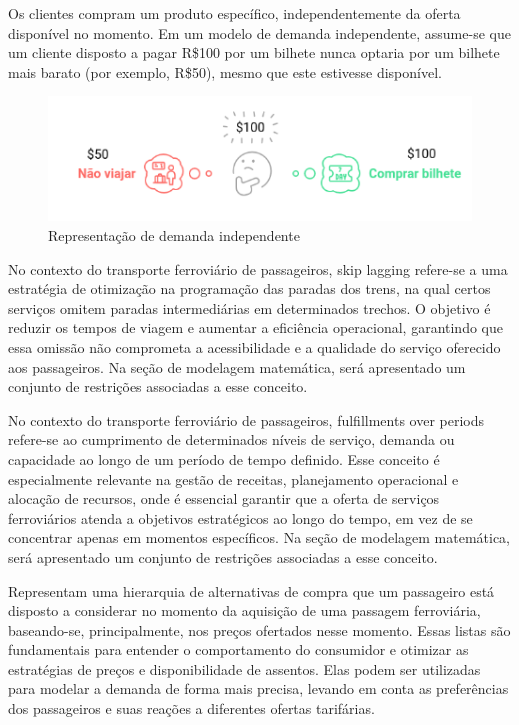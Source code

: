 \begin{description}[style=unboxed, leftmargin=0cm]
	\item[Demanda independente:] Os clientes compram um produto específico, independentemente da oferta disponível no momento. Em um modelo de demanda independente, assume-se que um cliente disposto a pagar R\$100 por um bilhete nunca optaria por um bilhete mais barato (por exemplo, R\$50), mesmo que este estivesse disponível.

	      \begin{figure}[H]
		      \begin{center}
			      \includegraphics[scale=0.7]{img/di1.png}
			      \caption{Representação de demanda independente}
			      \label{fig: di1}
		      \end{center}
	      \end{figure}
	      \vspace{-1cm}

	\item[Skip lagging:] No contexto do transporte ferroviário de passageiros, skip lagging refere-se a uma estratégia de otimização na programação das paradas dos trens, na qual certos serviços omitem paradas intermediárias em determinados trechos. O objetivo é reduzir os tempos de viagem e aumentar a eficiência operacional, garantindo que essa omissão não comprometa a acessibilidade e a qualidade do serviço oferecido aos passageiros. Na seção de modelagem matemática, será apresentado um conjunto de restrições associadas a esse conceito.

	\item[Fulfillments over periods:] No contexto do transporte ferroviário de passageiros, fulfillments over periods refere-se ao cumprimento de determinados níveis de serviço, demanda ou capacidade ao longo de um período de tempo definido. Esse conceito é especialmente relevante na gestão de receitas, planejamento operacional e alocação de recursos, onde é essencial garantir que a oferta de serviços ferroviários atenda a objetivos estratégicos ao longo do tempo, em vez de se concentrar apenas em momentos específicos. Na seção de modelagem matemática, será apresentado um conjunto de restrições associadas a esse conceito.

	\item[Listas de preferência:] Representam uma hierarquia de alternativas de compra que um passageiro está disposto a considerar no momento da aquisição de uma passagem ferroviária, baseando-se, principalmente, nos preços ofertados nesse momento. Essas listas são fundamentais para entender o comportamento do consumidor e otimizar as estratégias de preços e disponibilidade de assentos. Elas podem ser utilizadas para modelar a demanda de forma mais precisa, levando em conta as preferências dos passageiros e suas reações a diferentes ofertas tarifárias.
\end{description}

